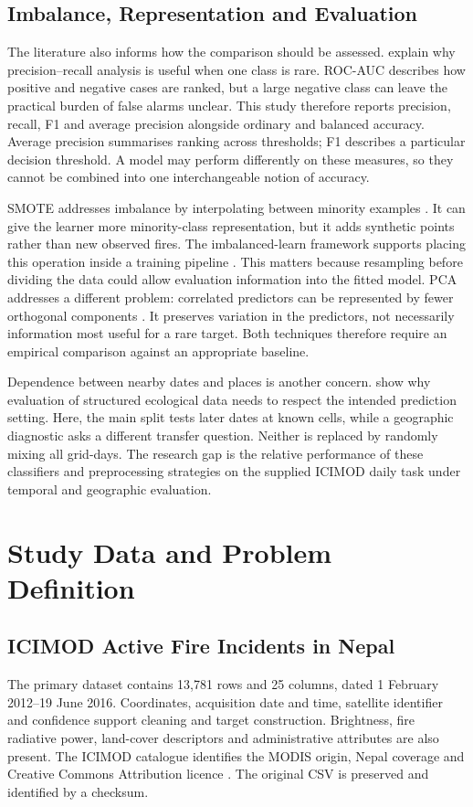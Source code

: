 \documentclass[conference,a4paper]{IEEEtran}
\begin{document}
\subsection{Imbalance, Representation and Evaluation}
The literature also informs how the comparison should be assessed. \citet{saito} explain why precision--recall analysis is useful when one class is rare. ROC-AUC describes how positive and negative cases are ranked, but a large negative class can leave the practical burden of false alarms unclear. This study therefore reports precision, recall, F1 and average precision alongside ordinary and balanced accuracy. Average precision summarises ranking across thresholds; F1 describes a particular decision threshold. A model may perform differently on these measures, so they cannot be combined into one interchangeable notion of accuracy.

SMOTE addresses imbalance by interpolating between minority examples \citep{chawla}. It can give the learner more minority-class representation, but it adds synthetic points rather than new observed fires. The imbalanced-learn framework supports placing this operation inside a training pipeline \citep{lemaitre}. This matters because resampling before dividing the data could allow evaluation information into the fitted model. PCA addresses a different problem: correlated predictors can be represented by fewer orthogonal components \citep{jolliffe}. It preserves variation in the predictors, not necessarily information most useful for a rare target. Both techniques therefore require an empirical comparison against an appropriate baseline.

Dependence between nearby dates and places is another concern. \citet{roberts} show why evaluation of structured ecological data needs to respect the intended prediction setting. Here, the main split tests later dates at known cells, while a geographic diagnostic asks a different transfer question. Neither is replaced by randomly mixing all grid-days. The research gap is the relative performance of these classifiers and preprocessing strategies on the supplied ICIMOD daily task under temporal and geographic evaluation.
\section{Study Data and Problem Definition}
\subsection{ICIMOD Active Fire Incidents in Nepal}
The primary dataset contains 13,781 rows and 25 columns, dated 1 February 2012--19 June 2016. Coordinates, acquisition date and time, satellite identifier and confidence support cleaning and target construction. Brightness, fire radiative power, land-cover descriptors and administrative attributes are also present. The ICIMOD catalogue identifies the MODIS origin, Nepal coverage and Creative Commons Attribution licence \citep{icimodfire}. The original CSV is preserved and identified by a checksum.
\end{document}
